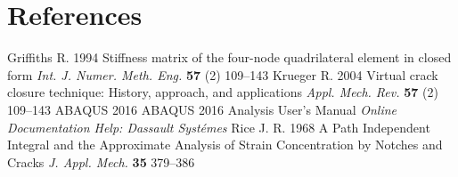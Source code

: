 \documentclass[a4paper]{jpconf}
\begin{document}
\section*{References}
\begin{thebibliography}{9}
Griffiths  R. 1994 Stiffness matrix of the four-node quadrilateral element in closed form {\it Int. J. Numer. Meth. Eng.} {\bf 57} (2) 109--143
Krueger R. 2004 Virtual crack closure technique: History, approach, and applications {\it Appl. Mech. Rev.} {\bf 57} (2) 109--143
 ABAQUS 2016 ABAQUS 2016 Analysis User's Manual {\it Online Documentation Help: Dassault Syst\'emes}
Rice J. R. 1968 A Path Independent Integral and the Approximate Analysis of Strain Concentration by Notches and Cracks {\it J. Appl. Mech.} {\bf 35} 379--386

\end{thebibliography}

\end{document}
